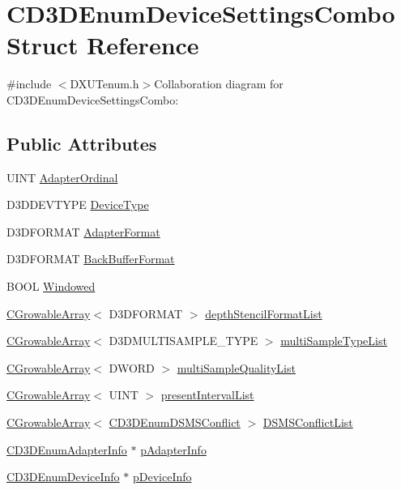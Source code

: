 \hypertarget{struct_c_d3_d_enum_device_settings_combo}{
\section{CD3DEnumDeviceSettingsCombo Struct Reference}
\label{struct_c_d3_d_enum_device_settings_combo}
}


{\ttfamily \#include $<$DXUTenum.h$>$}Collaboration diagram for CD3DEnumDeviceSettingsCombo:\subsection*{Public Attributes}
\begin{DoxyCompactItemize}
\item 
UINT \hyperlink{struct_c_d3_d_enum_device_settings_combo_aebf0b6ad3f1036fcba5a7742fb49059d}{AdapterOrdinal}
\item 
D3DDEVTYPE \hyperlink{struct_c_d3_d_enum_device_settings_combo_a430b870bdc5198bb9148e80b14ff2bd0}{DeviceType}
\item 
D3DFORMAT \hyperlink{struct_c_d3_d_enum_device_settings_combo_a4141e11ae457b2faf9b7e910e5a3167b}{AdapterFormat}
\item 
D3DFORMAT \hyperlink{struct_c_d3_d_enum_device_settings_combo_af71e8a8d9f1f739dce1e9ed608bcba48}{BackBufferFormat}
\item 
BOOL \hyperlink{struct_c_d3_d_enum_device_settings_combo_a1117df7df25ceaa63f497664f6ba98d1}{Windowed}
\item 
\hyperlink{class_c_growable_array}{CGrowableArray}$<$ D3DFORMAT $>$ \hyperlink{struct_c_d3_d_enum_device_settings_combo_a4c94ea1feca7fa92797bb93dd1e53e9a}{depthStencilFormatList}
\item 
\hyperlink{class_c_growable_array}{CGrowableArray}$<$ D3DMULTISAMPLE\_\-TYPE $>$ \hyperlink{struct_c_d3_d_enum_device_settings_combo_a55cd4a9f4fe26882fb88ac5f6e97487b}{multiSampleTypeList}
\item 
\hyperlink{class_c_growable_array}{CGrowableArray}$<$ DWORD $>$ \hyperlink{struct_c_d3_d_enum_device_settings_combo_ae7a167a5a9edf29366465cfed4b6d7ed}{multiSampleQualityList}
\item 
\hyperlink{class_c_growable_array}{CGrowableArray}$<$ UINT $>$ \hyperlink{struct_c_d3_d_enum_device_settings_combo_a2837c6202c73f23f560c0a5f641a111f}{presentIntervalList}
\item 
\hyperlink{class_c_growable_array}{CGrowableArray}$<$ \hyperlink{struct_c_d3_d_enum_d_s_m_s_conflict}{CD3DEnumDSMSConflict} $>$ \hyperlink{struct_c_d3_d_enum_device_settings_combo_a4543dd6327ec6e8cd3fd3eac2842881c}{DSMSConflictList}
\item 
\hyperlink{class_c_d3_d_enum_adapter_info}{CD3DEnumAdapterInfo} $\ast$ \hyperlink{struct_c_d3_d_enum_device_settings_combo_aa19ba203763b89e601bca6b9b63c4664}{pAdapterInfo}
\item 
\hyperlink{class_c_d3_d_enum_device_info}{CD3DEnumDeviceInfo} $\ast$ \hyperlink{struct_c_d3_d_enum_device_settings_combo_a8d7ac13c75c72aa1f1f43c9b64d2988a}{pDeviceInfo}
\end{DoxyCompactItemize}


